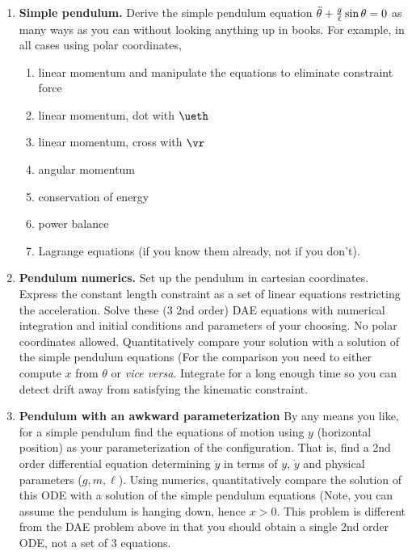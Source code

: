\documentclass[11pt]{article}
\def\tight{ \setlength{\itemsep}{1.5pt}\setlength{\parskip}{0pt}\setlength{\parsep}{0pt}}
\begin{document}
\begin{enumerate}
\item{\bf Simple pendulum.} \label{HWsimplependulum} Derive the simple
pendulum equation $\ddot\theta +{g\over\ell}\sin\theta=0$ as many ways as you can
without looking anything up in books.  For example, in all cases using polar coordinates,
\begin{enumerate}\tight
\item linear momentum and manipulate the equations to eliminate constraint force
\item linear momentum, dot with $\ueth$
\item linear momentum, cross with $\vr$
\item angular momentum
\item conservation of energy
\item power balance
\item Lagrange equations (if you know them already, not if you don't).
\end{enumerate}



\item{\bf Pendulum numerics.} \label{HWpendulumnumerics}
Set up the pendulum in cartesian coordinates. Express the constant
length constraint as a set of linear equations restricting the acceleration.
Solve these (3 2nd order) DAE equations with numerical integration and initial conditions and parameters of your choosing. No polar coordinates allowed.  Quantitatively compare your solution with a solution of the simple pendulum equations (For the comparison you need to either compute $x$ from $\theta$ or \textit{vice versa}.
Integrate for a long enough time so you can detect drift away from satisfying the kinematic constraint.




\item{\bf Pendulum with an awkward parameterization} \label{HWbadparam}
By any means you like, for a simple pendulum find the equations of motion  using $y$ (horizontal position) as your parameterization
of the configuration.  That is, find a 2nd order differential equation determining $\ddot y$ in terms of $y$, $\dot y$ and physical parameters ($g,m,\ell$).   Using numerics, quantitatively compare the solution of this ODE with a solution of the simple pendulum equations (Note, you can assume the pendulum is hanging down, hence $x>0$.  This problem is
different from the DAE problem above in that you should obtain a single 2nd order ODE, not a set of 3 equations.  
  

\end{enumerate}
\end{document}
